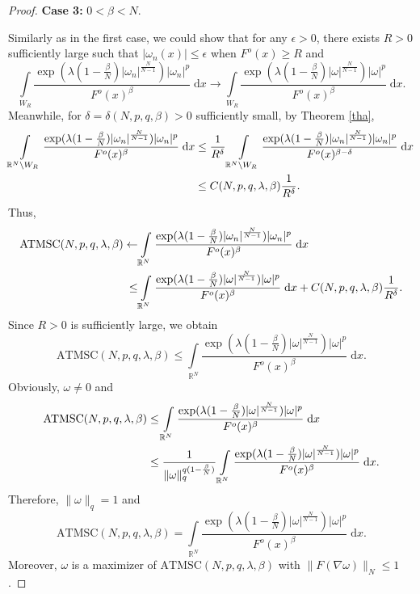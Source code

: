 \documentclass[11pt]{article}
\theoremstyle{plain}
\numberwithin{equation}{section}
\newcommand{\R}{\mathbb{R}}
\begin{document}
\begin{proof}
{\bfseries Case 3:} $0<\beta<N$.

Similarly as in the first case, we could show that for any $\epsilon>0$, there exists $R>0$ sufficiently large such that $\lvert\omega_{n}(x)\rvert\leq\epsilon$ when $F^{o}(x)\geq R$ and
$$
\int\limits_{W_{R}}\frac{\exp(\lambda(1-\frac{\beta}{N})\lvert \omega_{n}\rvert^{\frac{N}{N-1}})\lvert \omega_{n}\rvert^{p}}{F^{o}(x)^{\beta}}\;\mathrm{d}x\rightarrow\int\limits_{W_{R}}\frac{\exp(\lambda(1-\frac{\beta}{N})\lvert \omega\rvert^{\frac{N}{N-1}})\lvert \omega\rvert^{p}}{F^{o}(x)^{\beta}}\;\mathrm{d}x.
$$
Meanwhile, for $\delta=\delta(N,p,q,\beta)>0$ sufficiently small, by Theorem \ref{tha},
\begin{align}
    \int\limits_{\R^{N}\backslash W_{R}}\frac{\exp(\lambda(1-\frac{\beta}{N})\lvert \omega_{n}\rvert^{\frac{N}{N-1}})\lvert \omega_{n}\rvert^{p}}{F^{o}(x)^{\beta}}\;\mathrm{d}x&\leq\frac{1}{R^{\delta}}\int\limits_{\R^{N}\backslash W_{R}}\frac{\exp(\lambda(1-\frac{\beta}{N})\lvert \omega_{n}\rvert^{\frac{N}{N-1}})\lvert \omega_{n}\rvert^{p}}{F^{o}(x)^{\beta-\delta}}\;\mathrm{d}x\notag\\
    &\leq C(N,p,q,\lambda,\beta)\frac{1}{R^{\delta}}.\notag
\end{align}
Thus,
\begin{align}
    \mathrm{ATMSC}(N,p,q,\lambda,\beta)\leftarrow&\int\limits_{\R^{N}}\frac{\exp(\lambda(1-\frac{\beta}{N})\lvert \omega_{n}\rvert^{\frac{N}{N-1}})\lvert \omega_{n}\rvert^{p}}{F^{o}(x)^{\beta}}\;\mathrm{d}x\notag\\
    \leq&\int\limits_{\R^{N}}\frac{\exp(\lambda(1-\frac{\beta}{N})\lvert \omega\rvert^{\frac{N}{N-1}})\lvert \omega\rvert^{p}}{F^{o}(x)^{\beta}}\;\mathrm{d}x+C(N,p,q,\lambda,\beta)\frac{1}{R^{\delta}}.\notag
\end{align}
Since $R>0$ is sufficiently large, we obtain
$$
\mathrm{ATMSC}(N,p,q,\lambda,\beta)\leq\int\limits_{\R^{N}}\frac{\exp(\lambda(1-\frac{\beta}{N})\lvert \omega\rvert^{\frac{N}{N-1}})\lvert \omega\rvert^{p}}{F^{o}(x)^{\beta}}\;\mathrm{d}x.
$$
Obviously, $\omega\not=0$ and
\begin{align}
    \mathrm{ATMSC}(N,p,q,\lambda,\beta)&\leq\int\limits_{\R^{N}}\frac{\exp(\lambda(1-\frac{\beta}{N})\lvert \omega\rvert^{\frac{N}{N-1}})\lvert \omega\rvert^{p}}{F^{o}(x)^{\beta}}\;\mathrm{d}x\notag\\
    &\leq\frac{1}{\|\omega\|_{q}^{q(1-\frac{\beta}{N})}}\int\limits_{\R^{N}}\frac{\exp(\lambda(1-\frac{\beta}{N})\lvert \omega\rvert^{\frac{N}{N-1}})\lvert \omega\rvert^{p}}{F^{o}(x)^{\beta}}\;\mathrm{d}x.\notag
\end{align}
Therefore, $\|\omega\|_{q}=1$ and
$$
\mathrm{ATMSC}(N,p,q,\lambda,\beta)=\int\limits_{\R^{N}}\frac{\exp(\lambda(1-\frac{\beta}{N})\lvert \omega\rvert^{\frac{N}{N-1}})\lvert \omega\rvert^{p}}{F^{o}(x)^{\beta}}\;\mathrm{d}x.
$$
Moreover, $\omega$ is a maximizer of $\mathrm{ATMSC}(N,p,q,\lambda,\beta)$ with $\|F(\nabla\omega)\|_{N}\leq1$.


\end{proof}
\end{document}
